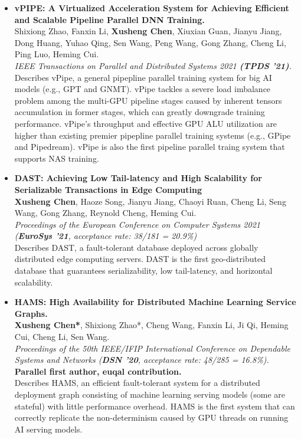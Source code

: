 \documentclass[a4paper,7pt]{article} %
\newcommand{\authors}[1]{{\small \fontfamily{cmss}\selectfont #1}}
\newcommand{\conference}[1]{\textit{\small \fontfamily{cmss}\selectfont #1}}
\newcommand{\info}[1]{{\footnotesize \fontfamily{cmss}\selectfont #1}}
\begin{document}
\begin{itemize}
    \item \textbf{vPIPE: A Virtualized Acceleration System for Achieving Efficient and Scalable Pipeline Parallel DNN Training.} \\
    \authors{Shixiong Zhao, Fanxin Li, \textbf{Xusheng Chen}, Xiuxian Guan, Jianyu Jiang, Dong Huang, Yuhao Qing, Sen Wang, Peng Wang, Gong Zhang, Cheng Li, Ping Luo, Heming Cui.} \\
    \conference{IEEE Transactions on Parallel and Distributed Systems 2021 \textbf{(TPDS '21)}.}  \\
    \info{Describes vPipe, a general pipepline parallel training system for big AI models (e.g., GPT and GNMT). vPipe tackles a severe load imbalance problem among the multi-GPU pipeline stages caused by inherent tensors accumulation in former stages, which can greatly downgrade training performance. vPipe's throughput and effective GPU ALU utilization are higher than existing premier pipepline parallel training systems (e.g., GPipe and Pipedream). vPipe is also the first pipeline parallel traing system that supports NAS training.}\\


    \item \textbf{DAST: Achieving Low Tail-latency and High Scalability for Serializable Transactions in Edge Computing} \\
    \authors{\textbf{Xusheng Chen}, Haoze Song, Jianyu Jiang, Chaoyi Ruan, Cheng Li, Seng Wang, Gong Zhang, Reynold Cheng, Heming Cui.} \\
    \conference{Proceedings of the European Conference on Computer Systems 2021 (\textbf{EuroSys '21}, acceptance rate: 38/181 = 20.9\%)} \\
    \info{Describes DAST, a fault-tolerant database deployed across
     globally distributed edge computing servers. DAST is the first
     geo-distributed database that guarantees serializability, low
     tail-latency, and horizontal scalability.} \\


    \item \textbf{HAMS: High Availability for Distributed Machine Learning Service Graphs.} \\ 
    \authors{\textbf{Xusheng Chen*}, Shixiong Zhao*, Cheng Wang, Fanxin Li, Ji Qi, Heming Cui, Cheng Li, Sen Wang.}\\
    \conference{Proceedings of the 50th IEEE/IFIP International Conference on Dependable Systems and Networks (\textbf{DSN '20}, acceptance rate: 48/285 = 16.8\%).}\\
    \authors{\bf* Parallel first author, euqal contribution.}\\
    \info{Describes HAMS, an efficient fault-tolerant system for a distributed
    deployment graph consisting of machine learning serving models (some are
    stateful) with little performance overhead. HAMS is the first system that
    can correctly replicate the non-determinism caused by GPU threads on running
    AI serving models.} \\
  


\end{itemize}
\end{document}
